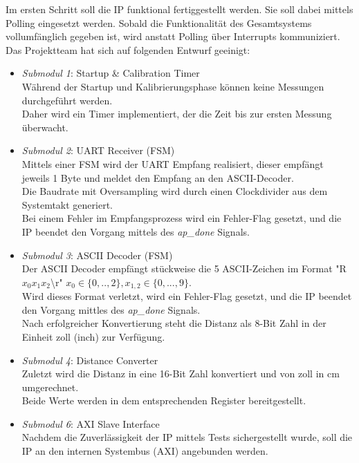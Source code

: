 Im ersten Schritt soll die IP funktional fertiggestellt werden. Sie soll dabei mittels Polling eingesetzt werden. Sobald die Funktionalität des Gesamtsystems vollumfänglich gegeben ist, wird anstatt Polling über Interrupts kommuniziert.\newline
\newline
Das Projektteam hat sich auf folgenden Entwurf geeinigt:

\begin{itemize}
    \item \textit{Submodul 1}: Startup \& Calibration Timer \\
    Während der Startup und Kalibrierungsphase können keine Messungen durchgeführt werden.\\
    Daher wird ein Timer implementiert, der die Zeit bis zur ersten Messung überwacht.
    \item \textit{Submodul 2}: UART Receiver (FSM) \\
    Mittels einer FSM wird der UART Empfang realisiert, dieser empfängt jeweils 1 Byte und meldet den Empfang an den ASCII-Decoder.\\
    Die Baudrate mit Oversampling wird durch einen Clockdivider aus dem Systemtakt generiert.\\
    Bei einem Fehler im Empfangsprozess wird ein Fehler-Flag gesetzt, und die IP beendet den Vorgang mittels des \textit{ap\_done} Signals.
    \item \textit{Submodul 3}: ASCII Decoder (FSM) \\
    Der ASCII Decoder empfängt stückweise die 5 ASCII-Zeichen im Format "R$x_0 x_ 1 x_ 2$\textbackslash r"
    \newline $x_0 \in \{ 0,..,2\}, x_{1,2} \in \{ 0,...,9 \}$.\\
    Wird dieses Format verletzt, wird ein Fehler-Flag gesetzt, und die IP beendet den Vorgang mittles des \textit{ap\_done} Signals.\\
    Nach erfolgreicher Konvertierung steht die Distanz als 8-Bit Zahl in der Einheit zoll (inch) zur Verfügung.
    \item \textit{Submodul 4}: Distance Converter \\
    Zuletzt wird die Distanz in eine 16-Bit Zahl konvertiert und von zoll in cm umgerechnet.\\
    Beide Werte werden in dem entsprechenden Register bereitgestellt.\\
    \item \textit{Submodul 6}: AXI Slave Interface  \\
    Nachdem die Zuverlässigkeit der IP mittels Tests sichergestellt wurde, soll die IP an den internen Systembus (AXI) angebunden werden.
\end{itemize}

